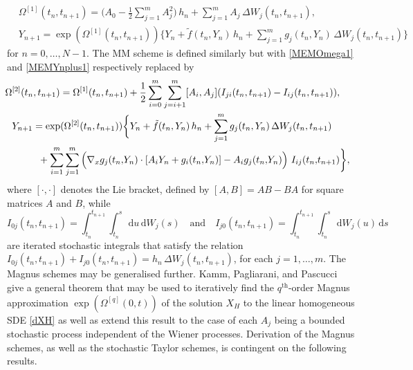 \documentclass[onefignum]{siamart250211}
\begin{document}
\begin{align}
&\Omega^{[1]}(t_n,t_{n+1})=\bigg(A_0-\frac{1}{2}\sum_{j=1}^mA_j^2\bigg)\,h_n+\sum_{j=1}^mA_j\,\Delta W_j(t_n,t_{n+1}),\label{MEMOmega1}\\
&Y_{n+1}=\exp(\Omega^{[1]}(t_n,t_{n+1}))\bigg\{\!Y_n\!+\!\tilde{f}(t_n,Y_n)\,h_n\!+\!\sum_{j=1}^mg_j(t_n,Y_n)\,\Delta W_j(t_n,t_{n+1})\!\bigg\}\label{MEMYnplus1}
\end{align}
for $n=0,\ldots,N-1$. The MM scheme is defined similarly but with \cref{MEMOmega1} and \cref{MEMYnplus1} respectively replaced by
\begin{align}
&\hspace{-1cm}\Omega^{[2]}(t_n,t_{n+1})=\Omega^{[1]}(t_n,t_{n+1})+\frac{1}{2}\sum_{i=0}^m\sum_{j=i+1}^m[A_i,A_j](I_{ji}(t_n,t_{n+1})-I_{ij}(t_n,t_{n+1})),\nonumber\\
Y_{n+1}&=\exp(\Omega^{[2]}(t_n,t_{n+1}))\bigg\{Y_n+\tilde{f}(t_n,Y_n)\,h_n+\sum_{j=1}^mg_j(t_n,Y_n)\,\Delta W_j(t_n,t_{n+1})\nonumber\\
&\;\;+\sum_{i=1}^m\sum_{j=1}^m\left(\vphantom{\sum}\nabla_xg_j(t_n,\!Y_n)\cdot\left[A_iY_n+g_i(t_n,\!Y_n)\right]-A_ig_j(t_n,\!Y_n)\vphantom{\sum}\right)\,I_{ij}(t_n,\!t_{n+1})\bigg\},\label{MMYnplus1}
\end{align}
where $[\cdot,\cdot]$ denotes the Lie bracket, defined by $[A,B]=AB-BA$ for square matrices $A$ and $B$, while
\begin{equation*}I_{0j}(t_n,t_{n+1})=\int_{t_n}^{t_{n+1}}\int_{t_n}^s\,\mathrm{d}u\,\mathrm{d}W_j(s)\quad\textrm{and}\quad I_{j0}(t_n,t_{n+1})=\int_{t_n}^{t_{n+1}}\int_{t_n}^s\,\mathrm{d}W_j(u)\,\mathrm{d}s\end{equation*}
are iterated stochastic integrals that satisfy the relation $I_{0j}(t_n,t_{n+1})+I_{j0}(t_n,t_{n+1})=h_n\,\Delta W_j(t_n,t_{n+1})$, for each $j=1,\ldots,m$. The Magnus schemes may be generalised further. Kamm, Pagliarani, and Pascucci \cite{Kamm2021} give a general theorem that may be used to iteratively find the $q^\mathrm{th}$-order Magnus approximation $\exp(\Omega^{[q]}(0,t))$ of the solution $X_H$ to the linear homogeneous SDE \cref{dXH}
 as well as extend this result to the case of each $A_j$ being a bounded stochastic process independent of the Wiener processes. Derivation of the Magnus schemes, as well as the stochastic Taylor schemes, is contingent on the following results.
\end{document}
